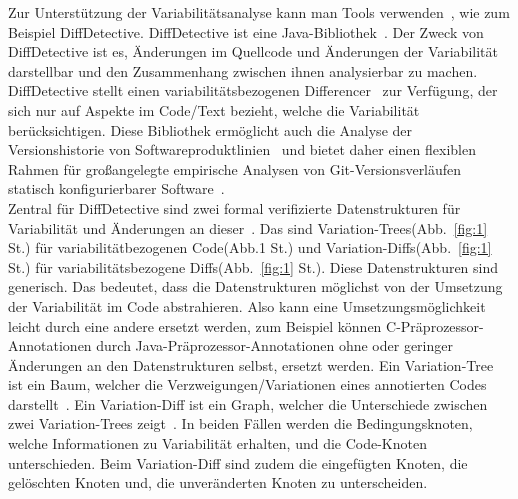 \documentclass[11pt,a4paper,oneside]{article}
\newcommand*\numcircledtikz[1]{\tikz[baseline=(char.base)]{
		\node[circle,draw,double,inner sep=1.2pt] (char) {#1};}}
\begin{document}
	
	
	Zur Unterstützung der Variabilitätsanalyse kann man Tools verwenden~\cite{SSK+:VaMoS20,10.1145/2660190.2662113}, wie zum Beispiel DiffDetective. DiffDetective ist eine Java-Bibliothek~\cite{BSM+:FSE24}. Der Zweck von DiffDetective ist es, Änderungen im Quellcode und Änderungen der Variabilität darstellbar und den Zusammenhang zwischen ihnen analysierbar zu machen. DiffDetective stellt einen variabilitätsbezogenen Differencer~\cite{BSM+:FSE24,BTS+:ESECFSE22} zur Verfügung, der sich nur auf Aspekte im Code/Text bezieht, welche die Variabilität berücksichtigen. Diese Bibliothek ermöglicht auch die Analyse der Versionshistorie von Softwareproduktlinien~\cite{BTS+:ESECFSE22} und bietet daher einen flexiblen Rahmen für großangelegte empirische Analysen von Git-Versionsverläufen statisch konfigurierbarer Software~\cite{BSM+:FSE24,BSG+:SPLC23}.\\
	 
	Zentral für DiffDetective sind zwei formal verifizierte Datenstrukturen für Variabilität und Änderungen an dieser~\cite{BTS+:ESECFSE22}. Das sind Variation-Trees(Abb.~\ref{fig:1} St.\numcircledtikz{x}) für variabilitätbezogenen Code(Abb.1 St.\numcircledtikz{v}) und Variation-Diffs(Abb.~\ref{fig:1} St.\numcircledtikz{y}) für variabilitätsbezogene Diffs(Abb.~\ref{fig:1} St.\numcircledtikz{w}). Diese Datenstrukturen sind generisch. Das bedeutet, dass die Datenstrukturen möglichst von der Umsetzung der Variabilität im Code abstrahieren. Also kann eine Umsetzungsmöglichkeit leicht durch eine andere ersetzt werden, zum Beispiel können C-Präprozessor-Annotationen  durch Java-Präprozessor-Annotationen ohne oder geringer Änderungen an den Datenstrukturen selbst, ersetzt werden. Ein Variation-Tree ist ein Baum, welcher die Verzweigungen/Variationen eines annotierten Codes darstellt~\cite{BSM+:FSE24,BTS+:ESECFSE22,BSG+:SPLC23}. Ein Variation-Diff ist ein Graph, welcher die Unterschiede zwischen zwei Variation-Trees zeigt~\cite{BSM+:FSE24,BTS+:ESECFSE22,BSG+:SPLC23}. In beiden Fällen werden die Bedingungsknoten, welche Informationen zu Variabilität erhalten, und die Code-Knoten unterschieden. Beim Variation-Diff sind zudem die eingefügten Knoten, die gelöschten Knoten und, die unveränderten Knoten zu unterscheiden.\\
	 
	
	
\end{document}
